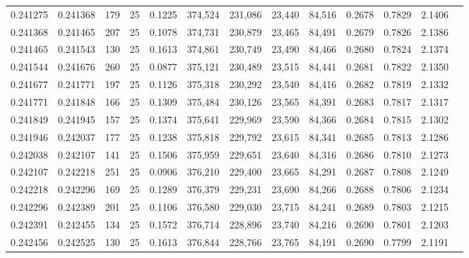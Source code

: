 \begin{tabular}{rrrrrrrrrrrrr}
0.241275 & 0.241368 &   179 &  25 &                                     0.1225 & 374,524 & 231,086 &  23,440 &  84,516 & 0.2678 & 0.7829 & 2.1406 \\
0.241368 & 0.241465 &   207 &  25 &                                     0.1078 & 374,731 & 230,879 &  23,465 &  84,491 & 0.2679 & 0.7826 & 2.1386 \\
0.241465 & 0.241543 &   130 &  25 &                                     0.1613 & 374,861 & 230,749 &  23,490 &  84,466 & 0.2680 & 0.7824 & 2.1374 \\
0.241544 & 0.241676 &   260 &  25 &                                     0.0877 & 375,121 & 230,489 &  23,515 &  84,441 & 0.2681 & 0.7822 & 2.1350 \\
0.241677 & 0.241771 &   197 &  25 &                                     0.1126 & 375,318 & 230,292 &  23,540 &  84,416 & 0.2682 & 0.7819 & 2.1332 \\
0.241771 & 0.241848 &   166 &  25 &                                     0.1309 & 375,484 & 230,126 &  23,565 &  84,391 & 0.2683 & 0.7817 & 2.1317 \\
0.241849 & 0.241945 &   157 &  25 &                                     0.1374 & 375,641 & 229,969 &  23,590 &  84,366 & 0.2684 & 0.7815 & 2.1302 \\
0.241946 & 0.242037 &   177 &  25 &                                     0.1238 & 375,818 & 229,792 &  23,615 &  84,341 & 0.2685 & 0.7813 & 2.1286 \\
0.242038 & 0.242107 &   141 &  25 &                                     0.1506 & 375,959 & 229,651 &  23,640 &  84,316 & 0.2686 & 0.7810 & 2.1273 \\
0.242107 & 0.242218 &   251 &  25 &                                     0.0906 & 376,210 & 229,400 &  23,665 &  84,291 & 0.2687 & 0.7808 & 2.1249 \\
0.242218 & 0.242296 &   169 &  25 &                                     0.1289 & 376,379 & 229,231 &  23,690 &  84,266 & 0.2688 & 0.7806 & 2.1234 \\
0.242296 & 0.242389 &   201 &  25 &                                     0.1106 & 376,580 & 229,030 &  23,715 &  84,241 & 0.2689 & 0.7803 & 2.1215 \\
0.242391 & 0.242455 &   134 &  25 &                                     0.1572 & 376,714 & 228,896 &  23,740 &  84,216 & 0.2690 & 0.7801 & 2.1203 \\
0.242456 & 0.242525 &   130 &  25 &                                     0.1613 & 376,844 & 228,766 &  23,765 &  84,191 & 0.2690 & 0.7799 & 2.1191 \\

\end{tabular}
